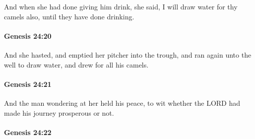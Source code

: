 			And when she had done giving him drink, she said, I will draw water for thy camels also, until they have done drinking.


		\paragraph{Genesis 24:20} %
			\label{GENESIS-24-20}

			And she hasted, and emptied her pitcher into the trough, and ran again unto the well to draw water, and drew for all his camels.


		\paragraph{Genesis 24:21} %
			\label{GENESIS-24-21}

			And the man wondering at her held his peace, to wit whether the LORD had made his journey prosperous or not.


		\paragraph{Genesis 24:22} %
			\label{GENESIS-24-22}

